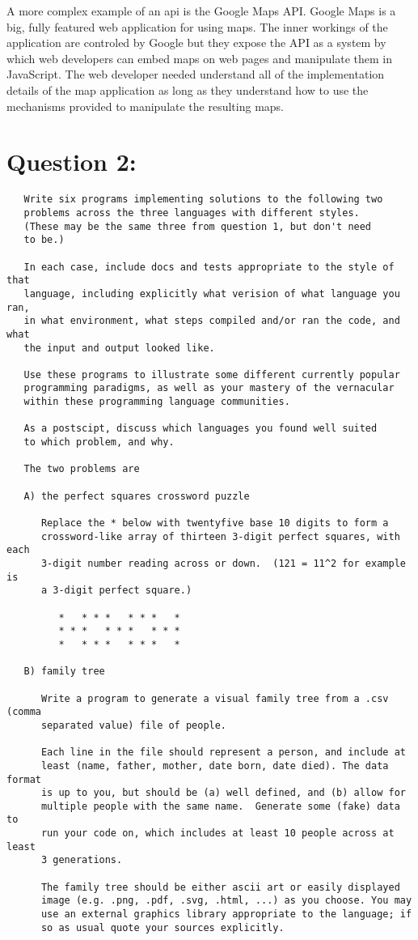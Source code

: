 \documentclass[11pt]{article}
\begin{document}
   A more complex example of an api is the Google Maps API.  Google
   Maps is a big, fully featured web application for using maps.  The
   inner workings of the application are controled by Google but they
   expose the API as a system by which web developers can embed maps
   on web pages and manipulate them in JavaScript.  The web developer
   needed understand all of the implementation details of the map
   application as long as they understand how to use the mechanisms
   provided to manipulate the resulting maps.
   
   
\section*{Question 2:}
\label{sec-2}

  
\begin{verbatim}
   Write six programs implementing solutions to the following two
   problems across the three languages with different styles.
   (These may be the same three from question 1, but don't need
   to be.)
   
   In each case, include docs and tests appropriate to the style of that
   language, including explicitly what verision of what language you ran,
   in what environment, what steps compiled and/or ran the code, and what
   the input and output looked like.
   
   Use these programs to illustrate some different currently popular
   programming paradigms, as well as your mastery of the vernacular
   within these programming language communities.
   
   As a postscipt, discuss which languages you found well suited
   to which problem, and why.
   
   The two problems are
   
   A) the perfect squares crossword puzzle
   
      Replace the * below with twentyfive base 10 digits to form a
      crossword-like array of thirteen 3-digit perfect squares, with each
      3-digit number reading across or down.  (121 = 11^2 for example is
      a 3-digit perfect square.)
   
         *   * * *   * * *   *
         * * *   * * *   * * *
         *   * * *   * * *   *
   
   B) family tree
   
      Write a program to generate a visual family tree from a .csv (comma
      separated value) file of people.
   
      Each line in the file should represent a person, and include at
      least (name, father, mother, date born, date died). The data format
      is up to you, but should be (a) well defined, and (b) allow for
      multiple people with the same name.  Generate some (fake) data to
      run your code on, which includes at least 10 people across at least
      3 generations.
      
      The family tree should be either ascii art or easily displayed
      image (e.g. .png, .pdf, .svg, .html, ...) as you choose. You may
      use an external graphics library appropriate to the language; if
      so as usual quote your sources explicitly.
\end{verbatim}
\end{document}
